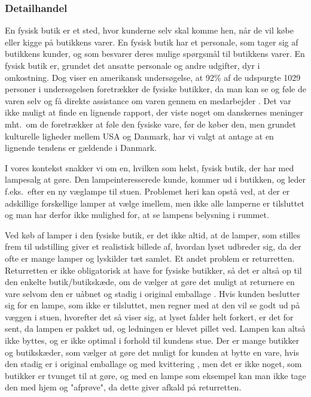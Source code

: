 \subsubsection{Detailhandel}
En fysisk butik er et sted, hvor kunderne selv skal komme hen, når de vil købe eller kigge på butikkens varer. En fysisk butik har et personale, som tager sig af butikkens kunder, og som besvarer deres mulige spørgsmål til butikkens varer. En fysisk butik er, grundet det ansatte personale og andre udgifter, dyr i omkostning. Dog viser en amerikansk undersøgelse, at 92\% af de udspurgte 1029 personer i undersøgelsen foretrækker de fysiske butikker, da man kan se og føle de varen selv og få direkte assistance om varen gennem en medarbejder \cite{fysisk_kontra_online}. Det var ikke muligt at finde en lignende rapport, der viste noget om danskernes meninger mht.\ om de foretrækker at føle den fysiske vare, før de køber den, men grundet kulturelle ligheder mellem USA og Danmark, har vi valgt at antage at en lignende tendens er gældende i Danmark.

I vores kontekst snakker vi om en, hvilken som helst, fysisk butik, der har med lampesalg at gøre. Den lampeinteresserede kunde, kommer ud i butikken, og leder f.eks.\ efter en ny væglampe til stuen. Problemet heri kan opstå ved, at der er adskillige forskellige lamper at vælge imellem, men ikke alle lamperne er tilsluttet og man har derfor ikke mulighed for, at se lampens belysning i rummet.

\label{sec:sammenligning_af_e_og_d}
Ved køb af lamper i den fysiske butik, er det ikke altid, at de lamper, som stilles frem til udstilling giver et realistisk billede af, hvordan lyset udbreder sig, da der ofte er mange lamper og lyskilder tæt samlet. Et andet problem er returretten. Returretten er ikke obligatorisk at have for fysiske butikker, så det er altså op til den enkelte butik/butikskæde, om de vælger at gøre det muligt at returnere en vare selvom den er uåbnet og stadig i original emballage \cite{fortrydelsesret}. Hvis kunden beslutter sig for en lampe, som ikke er tilsluttet, men regner med at den vil se godt ud på væggen i stuen, hvorefter det så viser sig, at lyset falder helt forkert, er det for sent, da lampen er pakket ud, og ledningen er blevet pillet ved. Lampen kan altså ikke byttes, og er ikke optimal i forhold til kundens stue. Der er mange butikker og butikskæder, som vælger at gøre det muligt for kunden at bytte en vare, hvis den stadig er i original emballage og med kvittering \cite{ikea_returret}, men det er ikke noget, som butikker er tvunget til at gøre, og med en lampe som eksempel kan man ikke tage den med hjem og "afprøve", da dette giver afkald på returretten.